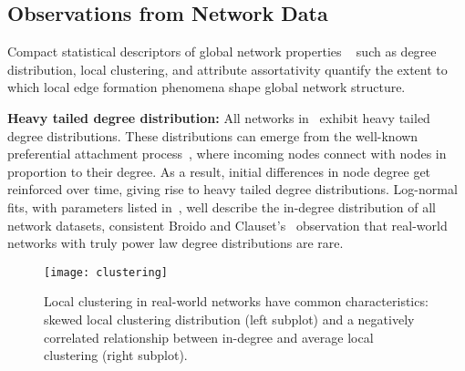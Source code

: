 %


\subsection{Observations from Network Data}
\label{subsec:factors}

Compact
statistical descriptors of global network properties ~\cite{newman2010networks}
such as degree distribution, local clustering, and attribute assortativity
quantify the extent to which local edge formation phenomena shape global network
structure.

\textbf{Heavy tailed degree distribution:}
All networks in~ exhibit heavy tailed degree distributions.
These distributions can emerge from the well-known preferential attachment
process~\cite{simon1955class,barabasi1999emergence}, where incoming nodes
connect with nodes in proportion to their degree. As a result, initial
differences in node degree get reinforced over time, giving rise to heavy tailed
degree distributions.
Log-normal fits, with parameters listed in~, well describe
the in-degree distribution of all network datasets, consistent Broido and
Clauset's~\cite{broido2018scale} observation that real-world networks with truly
power law degree distributions are rare.

\begin{figure}[H]
 \vspace{-10pt}
 \centering
 \texttt{[image: clustering]}
 \caption{
    Local clustering in real-world networks have common characteristics:
    skewed local clustering distribution (left subplot) and a negatively correlated
    relationship between in-degree and average local clustering (right subplot).
 }
 \label{fig:cc_dc}
 \vspace{-10pt}
\end{figure}

